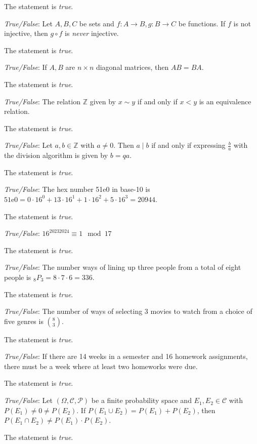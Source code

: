\documentclass[11pt,letterpaper]{article}
\begin{document}
\sol The statement is \textit{true}. 



\quizsol \textit{True/False}: Let $A, B, C$ be sets and $f: A \to B, g: B \to C$ be functions. If $f$ is not injective, then $g \circ f$ is \textit{never} injective. \pspace

\sol The statement is \textit{true}. 


\quizsol \textit{True/False}: If $A, B$ are $n \times n$ diagonal matrices, then $AB= BA$. \pspace

\sol The statement is \textit{true}. 


\quizsol \textit{True/False}: The relation $\mathbb{Z}$ given by $x \sim y$ if and only if $x < y$ is an equivalence relation. \pspace

\sol The statement is \textit{true}. 


\quizsol \textit{True/False}: Let $a, b \in \mathbb{Z}$ with $a \neq 0$. Then $a \mid b$ if and only if expressing $\frac{b}{a}$ with the division algorithm is given by $b= qa$. \pspace

\sol The statement is \textit{true}. 


\quizsol \textit{True/False}: The hex number 51e0 in base-10 is $\text{51e0}= 0 \cdot 16^0 + 13 \cdot 16^1 + 1 \cdot 16^2 + 5 \cdot 16^3= 20944$. \pspace

\sol The statement is \textit{true}. 


\quizsol \textit{True/False}: $16^{20232024} \equiv 1 \mod 17$ \pspace

\sol The statement is \textit{true}. 


\quizsol \textit{True/False}: The number ways of lining up three people from a total of eight people is $_8P_3= 8 \cdot7 \cdot 6= 336$. \pspace

\sol The statement is \textit{true}. 


\quizsol \textit{True/False}: The number of ways of selecting 3 movies to watch from a choice of five genres is $\binom{8}{3}$. \pspace

\sol The statement is \textit{true}. 


\quizsol \textit{True/False}: If there are 14 weeks in a semester and 16 homework assignments, there must be a week where at least two homeworks were due. \pspace

\sol The statement is \textit{true}. 



\quizsol \textit{True/False}: Let $(\Omega, \mathcal{C}, \mathcal{P})$ be a finite probability space and $E_1, E_2 \in \mathcal{C}$ with $P(E_1) \neq 0 \neq P(E_2)$. If $P(E_1 \cup E_2)= P(E_1) + P(E_2)$, then $P(E_1 \cap E_2) \neq P(E_1) \cdot P(E_2)$. \pspace

\sol The statement is \textit{true}. 
\end{document}
